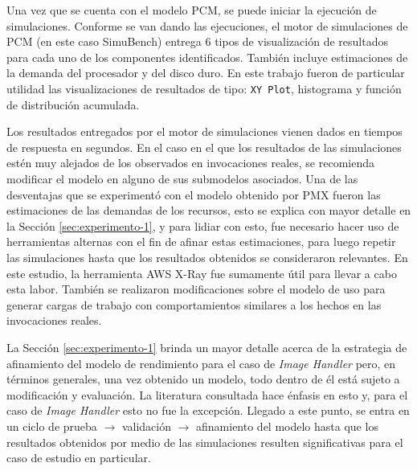 Una vez que se cuenta con el modelo PCM, se puede iniciar la ejecución de simulaciones. Conforme se van dando las ejecuciones, el motor de simulaciones de PCM (en este caso SimuBench) entrega 6 tipos de visualización de resultados para cada uno de los componentes identificados. También incluye estimaciones de la demanda del procesador y del disco duro. En este trabajo fueron de particular utilidad las visualizaciones de resultados de tipo: \texttt{XY Plot}, histograma y función de distribución acumulada.

Los resultados entregados por el motor de simulaciones vienen dados en tiempos de respuesta en segundos. En el caso en el que los resultados de las simulaciones estén muy alejados de los observados en invocaciones reales, se recomienda modificar el modelo en alguno de sus submodelos asociados. Una de las desventajas que se experimentó con el modelo obtenido por PMX fueron las estimaciones de las demandas de los recursos, esto se explica con mayor detalle en la Sección \ref{sec:experimento-1}, y para lidiar con esto, fue necesario hacer uso de herramientas alternas con el fin de afinar estas estimaciones, para luego repetir las simulaciones hasta que los resultados obtenidos se consideraron relevantes. En este estudio, la herramienta AWS X-Ray fue sumamente útil para llevar a cabo esta labor. También se realizaron modificaciones sobre el modelo de uso para generar cargas de trabajo con comportamientos similares a los hechos en las invocaciones reales.

La Sección \ref{sec:experimento-1} brinda un mayor detalle acerca de la estrategia de afinamiento del modelo de rendimiento para el caso de \emph{Image Handler} pero, en términos generales, una vez obtenido un modelo, todo dentro de él está sujeto a modificación y evaluación. La literatura consultada hace énfasis en esto y, para el caso de \emph{Image Handler} esto no fue la excepción. Llegado a este punto, se entra en un ciclo de prueba $\rightarrow$ validación $\rightarrow$ afinamiento del modelo hasta que los resultados obtenidos por medio de las simulaciones resulten significativas para el caso de estudio en particular.

